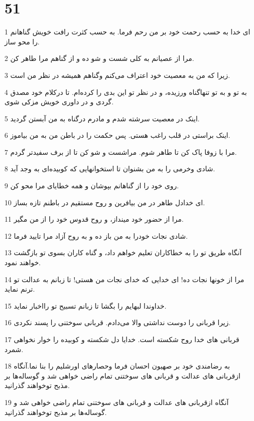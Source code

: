 \chapter{51}

\par 1 ای خدا به حسب رحمت خود بر من رحم فرما. به حسب کثرت رافت خویش گناهانم را محو ساز.
\par 2 مرا از عصیانم به کلی شست و شو ده و از گناهم مرا طاهر کن.
\par 3 زیرا که من به معصیت خود اعتراف می‌کنم وگناهم همیشه در نظر من است.
\par 4 به تو و به تو تنهاگناه ورزیده، و در نظر تو این بدی را کرده‌ام. تا درکلام خود مصدق گردی و در داوری خویش مزکی شوی.
\par 5 اینک در معصیت سرشته شدم و مادرم درگناه به من آبستن گردید. 
\par 6 اینک براستی در قلب راغب هستی. پس حکمت را در باطن من به من بیاموز.
\par 7 مرا با زوفا پاک کن تا طاهر شوم. مراشست و شو کن تا از برف سفیدتر گردم.
\par 8 شادی وخرمی را به من بشنوان تا استخوانهایی که کوبیده‌ای به وجد آید.
\par 9 روی خود را از گناهانم بپوشان و همه خطایای مرا محو کن.
\par 10 ‌ای خدادل طاهر در من بیافرین و روح مستقیم در باطنم تازه بساز.
\par 11 مرا از حضور خود مینداز، و روح قدوس خود را از من مگیر.
\par 12 شادی نجات خودرا به من باز ده و به روح آزاد مرا تایید فرما.
\par 13 آنگاه طریق تو را به خطاکاران تعلیم خواهم داد، و گناه کاران بسوی تو بازگشت خواهند نمود.
\par 14 مرا از خونها نجات ده! ای خدایی که خدای نجات من هستی! تا زبانم به عدالت تو ترنم نماید.
\par 15 خداوندا لبهایم را بگشا تا زبانم تسبیح تو رااخبار نماید.
\par 16 زیرا قربانی را دوست نداشتی والا می‌دادم. قربانی سوختنی را پسند نکردی.
\par 17 قربانی های خدا روح شکسته است. خدایا دل شکسته و کوبیده را خوار نخواهی شمرد.
\par 18 به رضامندی خود بر صهیون احسان فرما وحصارهای اورشلیم را بنا نما.آنگاه ازقربانی های عدالت و قربانی های سوختنی تمام راضی خواهی شد و گوساله‌ها بر مذبح توخواهند گذرانید.
\par 19 آنگاه ازقربانی های عدالت و قربانی های سوختنی تمام راضی خواهی شد و گوساله‌ها بر مذبح توخواهند گذرانید.
 

